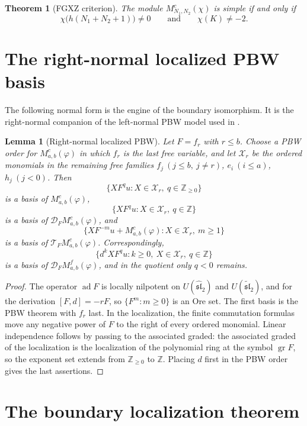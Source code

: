 \documentclass[11pt,a4paper]{article}
\newcommand{\Z}{\mathbb Z}
\newcommand{\slh}{\widehat{\mathfrak{sl}}_2}
\newcommand{\slt}{\widetilde{\mathfrak{sl}}_2}
\newcommand{\ad}{\operatorname{ad}}
\newcommand{\X}{\mathcal X}
\newcommand{\D}{\mathcal D}
\newcommand{\T}{\mathcal T}
\theoremstyle{plainupright}
\newtheorem{lemma}[proposition]{Lemma}
\newtheorem{theorem}[proposition]{Theorem}
\begin{document}
\begin{theorem}[FGXZ criterion]\label{thm:fgxz}
The module \(M^c_{N_1,N_2}(\chi)\) is simple if and only if
\[
\chi\bigl(h(N_1+N_2+1)\bigr)\ne0\qquad\text{and}\qquad \chi(K)\ne-2.
\]
\end{theorem}

\section{The right-normal localized PBW basis}\label{sec:pbw}

The following normal form is the engine of the boundary isomorphism. It is the
right-normal companion of the left-normal PBW model used in \cite{Nonboundary}.

\begin{lemma}[Right-normal localized PBW]\label{lem:right-pbw}
Let \(F=f_r\) with \(r\le b\). Choose a PBW order for \(M^c_{a,b}(\varphi)\) in
which \(f_r\) is the \emph{last} free variable, and let \(\X_r\) be the
ordered monomials in the remaining free families
\(f_j\ (j\le b,\ j\ne r)\), \(e_i\ (i\le a)\), \(h_j\ (j<0)\). Then
\[
\{XF^qu:X\in\X_r,\ q\in\Z_{\ge0}\}
\]
is a basis of \(M^c_{a,b}(\varphi)\),
\[
\{XF^qu:X\in\X_r,\ q\in\Z\}
\]
is a basis of \(\D_FM^c_{a,b}(\varphi)\), and
\[
\{XF^{-m}u+M^c_{a,b}(\varphi):X\in\X_r,\ m\ge1\}
\]
is a basis of \(\T_FM^c_{a,b}(\varphi)\). Correspondingly,
\[
\{d^kXF^qu:k\ge0,\ X\in\X_r,\ q\in\Z\}
\]
is a basis of \(\D_FM^f_{a,b}(\varphi)\), and in the quotient only \(q<0\)
remains.
\end{lemma}

\begin{proof}
The operator \(\ad F\) is locally nilpotent on \(U(\slh)\) and \(U(\slt)\), and
for the derivation \([F,d]=-rF\), so \(\{F^m:m\ge0\}\) is an Ore set. The first
basis is the PBW theorem with \(f_r\) last. In the localization, the finite
commutation formulas move any negative power of \(F\) to the right of every
ordered monomial. Linear independence follows by passing to the associated
graded: the associated graded of the localization is the localization of the
polynomial ring at the symbol \(\operatorname{gr}F\), so the exponent set
extends from \(\Z_{\ge0}\) to \(\Z\). Placing \(d\) first in the PBW order
gives the last assertions.
\end{proof}

\section{The boundary localization theorem}\label{sec:boundary}
\end{document}
